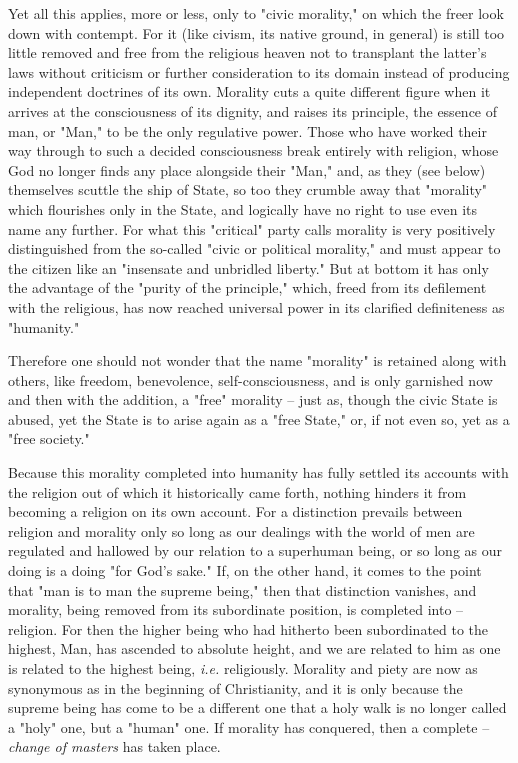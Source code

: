 \documentclass[a4paper]{book}
\begin{document}
Yet all this applies, more or less, only to "{}civic morality,"{} on which the 
freer look down with contempt. For it (like civism, its native ground, in 
general) is still too little removed and free from the religious heaven not to 
transplant the latter's laws without criticism or further consideration to its 
domain instead of producing independent doctrines of its own. Morality cuts a 
quite different figure when it arrives at the consciousness of its dignity, 
and raises its principle, the essence of man, or "{}Man,"{} to be the only 
regulative power. Those who have worked their way through to such a decided 
consciousness break entirely with religion, whose God no longer finds any 
place alongside their "{}Man,"{} and, as they (see below) themselves scuttle 
the ship of State, so too they crumble away that "{}morality"{} which 
flourishes only in the State, and logically have no right to use even its name 
any further. For what this "{}critical"{} party calls morality is very 
positively distinguished from the so-called "{}civic or political morality,"{} 
and must appear to the citizen like an "{}insensate and unbridled liberty."{} 
But at bottom it has only the advantage of the "{}purity of the principle,"{} 
which, freed from its defilement with the religious, has now reached universal 
power in its clarified definiteness as "{}humanity."{}

Therefore one should not wonder that the name "{}morality"{} is retained along 
with others, like freedom, benevolence, self-consciousness, and is only 
garnished now and then with the addition, a "{}free"{} morality -- just as, 
though the civic State is abused, yet the State is to arise again as a "{}free 
State,"{} or, if not even so, yet as a "{}free society."{}

Because this morality completed into humanity has fully settled its accounts 
with the religion out of which it historically came forth, nothing hinders it 
from becoming a religion on its own account. For a distinction prevails 
between religion and morality only so long as our dealings with the world of 
men are regulated and hallowed by our relation to a superhuman being, or so 
long as our doing is a doing "{}for God's sake."{} If, on the other hand, it 
comes to the point that "{}man is to man the supreme being,"{} then that 
distinction vanishes, and morality, being removed from its subordinate 
position, is completed into -- religion. For then the higher being who had 
hitherto been subordinated to the highest, Man, has ascended to absolute 
height, and we are related to him as one is related to the highest being, 
\textit{i.e.} religiously. Morality and piety are now as synonymous as in the 
beginning of Christianity, and it is only because the supreme being has come 
to be a different one that a holy walk is no longer called a "{}holy"{} one, 
but a "{}human"{} one. If morality has conquered, then a complete -- 
\textit{change of masters} has taken place.
\end{document}
